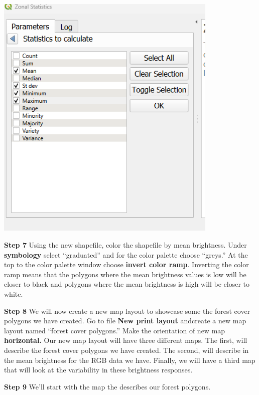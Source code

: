 \documentclass[
  letterpaper,
]{book}
\begin{document}
\includegraphics[width=4.17708in,height=\textheight]{images/clipboard-1244300705.png}

\textbf{Step 7} Using the new shapefile, color the shapefile by mean
brightness. Under \textbf{symbology} select ``graduated'' and for the
color palette choose ``greys.'' At the top to the color palette window
choose \textbf{invert color ramp}. Inverting the color ramp means that
the polygons where the mean brightness values is low will be closer to
black and polygons where the mean brightness is high will be closer to
white.

\textbf{Step 8} We will now create a new map layout to showcase some the
forest cover polygons we have created. Go to file \textbf{New print
layout} andcreate a new map layout named ``forest cover polygons.'' Make
the orientation of new map \textbf{horizontal.} Our new map layout will
have three different maps. The first, will describe the forest cover
polygons we have created. The second, will describe in the mean
brightness for the RGB data we have. Finally, we will have a third map
that will look at the variability in these brightness responses.

\textbf{Step 9} We'll start with the map the describes our forest
polygons.
\end{document}
